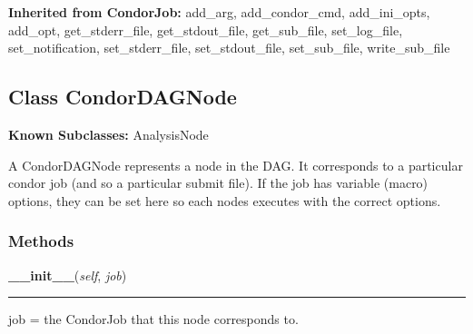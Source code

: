   \noindent\textbf{Inherited from CondorJob:}
    add\_arg,
    add\_condor\_cmd,
    add\_ini\_opts,
    add\_opt,
    get\_stderr\_file,
    get\_stdout\_file,
    get\_sub\_file,
    set\_log\_file,
    set\_notification,
    set\_stderr\_file,
    set\_stdout\_file,
    set\_sub\_file,
    write\_sub\_file


\subsection{Class CondorDAGNode}

    \label{pipeline:CondorDAGNode}
\textbf{Known Subclasses:} AnalysisNode

A CondorDAGNode represents a node in the DAG. It corresponds to a 
particular condor job (and so a particular submit file). If the job has 
variable (macro) options, they can be set here so each nodes executes 
with the correct options.



  \subsubsection{Methods}

    \label{pipeline:CondorDAGNode:__init__}
    \vspace{0.5ex}

    \noindent\begin{boxedminipage}{\textwidth}

    \raggedright \textbf{\_\_init\_\_}(\textit{self}, \textit{job})

    \vspace{-1.5ex}

    \rule{\textwidth}{0.5\fboxrule}
    job = the CondorJob that this node corresponds to.

    \vspace{1ex}

    \end{boxedminipage}

